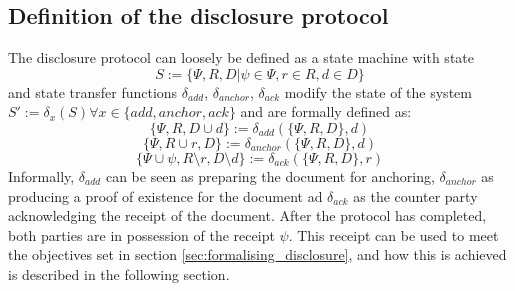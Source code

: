 \documentclass[12pt,msc,a4paper,oneside]{ucl_thesis}
\begin{document}
\subsection{Definition of the disclosure protocol}
The disclosure protocol can loosely be defined as a state machine with state
\begin{equation}
    S := \{\Psi, R, D | \psi \in \Psi, r \in R, d \in D\}
    \label{eq:disclosure_state_machine}
\end{equation}
and state transfer functions $\delta_{add}$, $\delta_{anchor}$, $\delta_{ack}$ modify the state of the system $S' := \delta_x(S) \forall x \in \{add, anchor, ack\}$ and are formally defined as:
\begin{equation}
    \{\Psi, R, D \cup d\} := \delta_{add}(\{\Psi, R, D\}, d)
    \label{eq:disclosure_delta_add}
\end{equation}
\begin{equation}
    \{\Psi, R \cup r, D\} := \delta_{anchor}(\{\Psi, R, D\}, d)
    \label{eq:disclosure_delta_anchor}
\end{equation}
\begin{equation}
    \{\Psi \cup \psi, R \setminus r, D \setminus d\} := \delta_{ack}(\{\Psi, R, D\}, r)
    \label{eq:disclosure_delta_ack}
\end{equation}
Informally, $\delta_{add}$ can be seen as preparing the document for anchoring, $\delta_{anchor}$ as producing a proof of existence for the document ad $\delta_{ack}$ as the counter party acknowledging the receipt of the document. After the protocol has completed, both parties are in possession of the receipt $\psi$. This receipt can be used to meet the objectives set in section \ref{sec:formalising_disclosure}, and how this is achieved is described in the following section.
\end{document}
